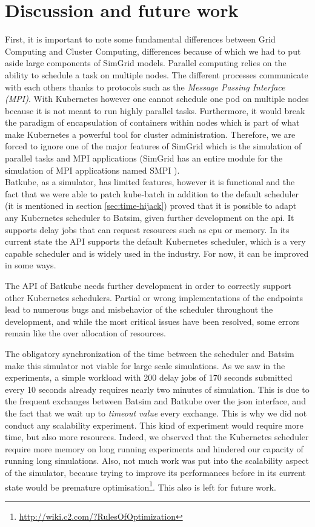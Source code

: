 \section{Discussion and future work}

First, it is important to note some fundamental differences between Grid
Computing and Cluster Computing, differences because of which we had to put
aside large components of SimGrid models. Parallel computing relies on the
ability to schedule a task on multiple nodes.  The different processes
communicate with each others thanks to protocols such as the \textit{Message
Passing Interface (MPI)}. With Kubernetes however one cannot schedule one pod
on multiple nodes because it is not meant to run highly parallel tasks.
Furthermore, it would break the paradigm of encapsulation of containers within
nodes which is part of what make Kubernetes a powerful tool for cluster
administration.  Therefore, we are forced to ignore one of the major features
of SimGrid which is the simulation of parallel tasks and MPI applications
(SimGrid has an entire module for the simulation of MPI applications named SMPI
\cite{casanova:hal-01017319}).\\

Batkube, as a simulator, has limited features, however it is functional and the
fact that we were able to patch kube-batch in addition to the default scheduler
(it is mentioned in section \ref{sec:time-hijack}) proved that it is possible
to adapt any Kubernetes scheduler to Batsim, given further development on the
api. It supports delay jobs that can request resources such as cpu or memory.
In its current state the API supports the default Kubernetes scheduler, which
is  a very capable scheduler and is widely used in the industry. For now, it
can be improved in some ways.

The API of Batkube needs further development in order to correctly support
other Kubernetes schedulers. Partial or wrong implementations of the endpoints
lead to numerous bugs and misbehavior of the scheduler throughout the
development, and while the most critical issues have been resolved, some errors
remain like the over allocation of resources.

The obligatory synchronization of the time between the scheduler and Batsim
make this simulator not viable for large scale simulations. As we saw in the
experiments, a simple workload with 200 delay jobs of 170 seconds submitted
every 10 seconds already requires nearly two minutes of simulation. This is due
to the frequent exchanges between Batsim and Batkube over the json interface,
and the fact that we wait up to \textit{timeout value} every exchange. This is
why we did not conduct any scalability experiment. This kind of experiment
would require more time, but also more resources. Indeed, we observed that the
Kubernetes scheduler require more memory on long running experiments and
hindered our capacity of running long simulations. Also, not much work was put
into the scalability aspect of the simulator, because trying to improve its
performances before in its current state would be premature
optimisation\footnote{\url{http://wiki.c2.com/?RulesOfOptimization}}. This also is
left for future work.

